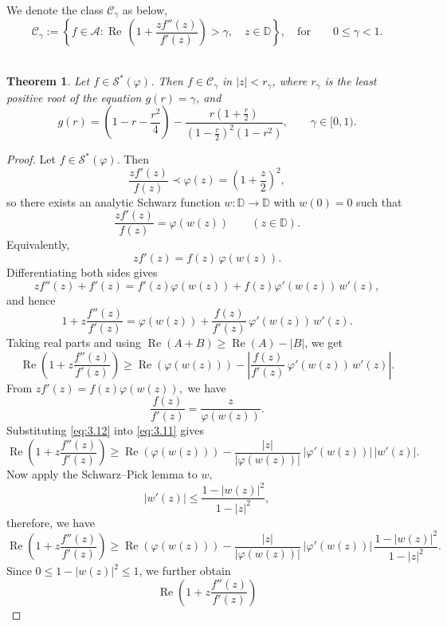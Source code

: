 \documentclass[a4paper,12pt,reqno]{amsart} %
\numberwithin{equation}{section}
\newtheorem{thm}{Theorem}[section]
\theoremstyle{definition}
\begin{document}
We denote the class $\mathcal{C}_\gamma$ as below,
\[
\mathcal{C}_\gamma
:=
\left\{
f \in \mathcal{A} :
\operatorname{Re}\, \left(1+\frac{z f''(z)}{f'(z)}\right)>\gamma,
\quad z\in\mathbb{D}
\right\}, \quad \mbox{for}\quad
\quad 0\le \gamma<1.
\]\\
\begin{thm}
Let $f \in \mathcal{S}^*(\varphi)$. Then $f\in \mathcal{C}_{\gamma}$ in $|z|< r_{\gamma}$, where $r_\gamma$ is the least positive root of the equation $g(r)=\gamma$, and
\[
g(r)=\left(1-r-\frac{r^2}{4}\right)-\frac{r\left(1+\frac r2\right)}{\left(1-\frac r2\right)^2(1-r^2)},
\qquad \gamma\in [0,1).
\]
\end{thm}

\begin{proof}
Let $f\in\mathcal{S}^*(\varphi)$. Then
\[
\frac{z f'(z)}{f(z)} \prec \varphi(z)=\left(1+\frac z2\right)^2,
\]
so there exists an analytic Schwarz function $w:\mathbb D\to\mathbb D$ with $w(0)=0$ such that
\[
\frac{z f'(z)}{f(z)}=\varphi(w(z)) \qquad (z\in\mathbb D).
\]
Equivalently,
\[
z f'(z)=f(z)\,\varphi(w(z)).
\]
Differentiating both sides gives
\[
z f''(z)+f'(z)=f'(z)\varphi(w(z)) + f(z)\varphi'(w(z))\,w'(z),
\]
and hence
\[
1+z\frac{f''(z)}{f'(z)}
=\varphi(w(z))+\frac{f(z)}{f'(z)}\,\varphi'(w(z))\,w'(z).
\]
Taking real parts and using $\operatorname{Re}(A+B)\ge \operatorname{Re}(A)-|B|$, we get
\begin{equation}\label{eq:3.11}
\operatorname{Re}\!\left(1+z\frac{f''(z)}{f'(z)}\right)
\ge \operatorname{Re}(\varphi(w(z)))-
\left|\frac{f(z)}{f'(z)}\,\varphi'(w(z))\,w'(z)\right|.
\end{equation}
From $z f'(z)=f(z)\varphi(w(z)),$ we have
\begin{equation}\label{eq:3.12}
\frac{f(z)}{f'(z)}=\frac{z}{\varphi(w(z))}.
\end{equation}
Substituting \eqref{eq:3.12} into \eqref{eq:3.11} gives
\[
\operatorname{Re}\!\left(1+z\frac{f''(z)}{f'(z)}\right)
\ge \operatorname{Re}(\varphi(w(z)))-
\frac{|z|}{|\varphi(w(z))|}\,|\varphi'(w(z))|\,|w'(z)|.
\]
Now apply the Schwarz--Pick lemma to $w,$
\[
|w'(z)|\le \frac{1-|w(z)|^2}{1-|z|^2},
\]
therefore, we have 
\begin{equation}\label{eq:3.13}
\operatorname{Re}\!\left(1+z\frac{f''(z)}{f'(z)}\right)
\ge \operatorname{Re}(\varphi(w(z)))-
\frac{|z|}{|\varphi(w(z))|}\,|\varphi'(w(z))|\,
\frac{1-|w(z)|^2}{1-|z|^2}.
\end{equation}
Since $0\le 1-|w(z)|^2\le 1$, we further obtain
\[
\operatorname{Re}\!\left(1+z\frac{f''(z)}{f'(z)}\right)
\]
\end{proof}
\end{document}

